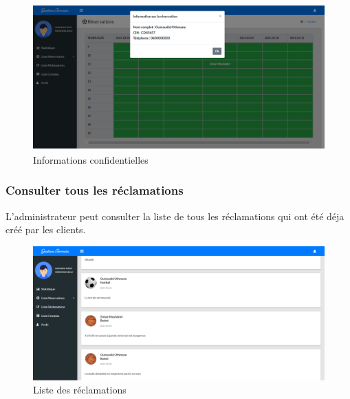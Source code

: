 \documentclass[a4paper]{report}
\begin{document}
\begin{spacing}{2}
\begin{figure}[!ht]
\begin{center}
\includegraphics[width=16cm]{Screenshots/Information-reservations.png}
\end{center}
\caption[Informations confidentielles]{Informations confidentielles }
\end{figure}


\subsubsection{Consulter tous les réclamations}
L'administrateur peut consulter la liste de tous les réclamations qui ont été déja créé par les clients.
\begin{figure}[!ht]
\begin{center}
\includegraphics[width=18cm]{Screenshots/all-Reclam.png}
\end{center}
\caption[Liste des réclamations]{Liste des réclamations}
\end{figure}

\end{spacing}
\end{document}
